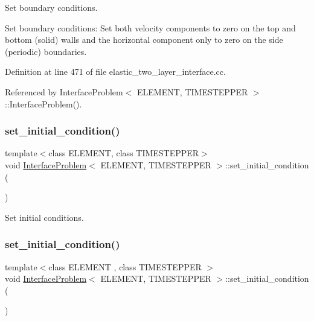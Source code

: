 Set boundary conditions. 

Set boundary conditions\+: Set both velocity components to zero on the top and bottom (solid) walls and the horizontal component only to zero on the side (periodic) boundaries. 

Definition at line 471 of file elastic\+\_\+two\+\_\+layer\+\_\+interface.\+cc.



Referenced by Interface\+Problem$<$ E\+L\+E\+M\+E\+N\+T, T\+I\+M\+E\+S\+T\+E\+P\+P\+E\+R $>$\+::\+Interface\+Problem().

\mbox{\label{classInterfaceProblem_a0d3af8378c4f0a6e38636be958c300d5}} 
\subsubsection{\texorpdfstring{set\+\_\+initial\+\_\+condition()}{set\_initial\_condition()}\hspace{0.1cm}{\footnotesize\ttfamily [1/2]}}
{\footnotesize\ttfamily template$<$class E\+L\+E\+M\+E\+NT, class T\+I\+M\+E\+S\+T\+E\+P\+P\+ER$>$ \\
void \hyperlink{classInterfaceProblem}{Interface\+Problem}$<$ E\+L\+E\+M\+E\+NT, T\+I\+M\+E\+S\+T\+E\+P\+P\+ER $>$\+::set\+\_\+initial\+\_\+condition (\begin{DoxyParamCaption}{ }\end{DoxyParamCaption})}



Set initial conditions. 

\mbox{\label{classInterfaceProblem_a0d3af8378c4f0a6e38636be958c300d5}} 
\subsubsection{\texorpdfstring{set\+\_\+initial\+\_\+condition()}{set\_initial\_condition()}\hspace{0.1cm}{\footnotesize\ttfamily [2/2]}}
{\footnotesize\ttfamily template$<$class E\+L\+E\+M\+E\+NT , class T\+I\+M\+E\+S\+T\+E\+P\+P\+ER $>$ \\
void \hyperlink{classInterfaceProblem}{Interface\+Problem}$<$ E\+L\+E\+M\+E\+NT, T\+I\+M\+E\+S\+T\+E\+P\+P\+ER $>$\+::set\+\_\+initial\+\_\+condition (\begin{DoxyParamCaption}{ }\end{DoxyParamCaption})}




